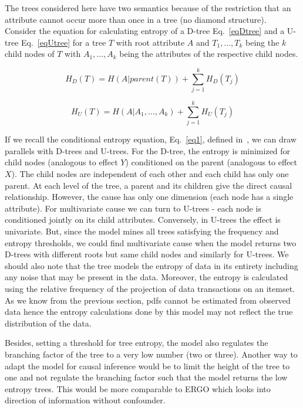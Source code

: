 \documentclass[10pt]{article}
\begin{document}
\par The trees considered here have two semantics because of the restriction that an attribute cannot occur more than once in a tree (no diamond structure). Consider the equation for calculating entropy of a D-tree Eq.~\eqref{eqDtree} and a U-tree Eq.~\eqref{eqUtree} for a tree $T$ with root attribute $A$ and $T_1, \ldots, T_k$ being the $k$ child nodes of $T$ with $A_1, \ldots, A_k$ being the attributes of the respective child nodes.

\begin{equation}\label{eqDtree}
H_D(T) = H(A|parent(T)) + \sum_{j=1}^{k}H_D(T_j)
\end{equation}

\begin{equation}\label{eqUtree}
H_U(T) = H(A|A_1, \ldots, A_k) + \sum_{j=1}^{k}H_U(T_j)
\end{equation}

\par If we recall the conditional entropy equation, Eq.~\eqref{eq1}, defined in~\cite{vreeken2015causal}, we can draw parallels with D-trees and U-trees. For the D-tree, the entropy is minimized for child nodes (analogous to effect $Y$) conditioned on the parent (analogous to effect $X$). The child nodes are independent of each other and each child has only one parent. At each level of the tree, a parent and its children give the direct causal relationship. However, the cause has only one dimension (each node has a single attribute). For multivariate cause we can turn to U-trees - each node is conditioned jointly on its child attributes. Conversely, in U-trees the effect is univariate. But, since the model mines all trees satisfying the frequency and entropy thresholds, we could find multivariate cause when the model returns two D-trees with different roots but same child nodes and similarly for U-trees. We should also note that the tree models the entropy of data in its  entirety including any noise that may be present in the data. Moreover, the entropy is calculated using the relative frequency of the projection of data transactions on an itemset. As we know from the previous section, pdfs cannot be estimated from observed data hence the entropy calculations done by this model may not reflect the true distribution of the data. 

\par Besides, setting a threshold for tree entropy, the model also regulates the branching factor of the tree to a very low number (two or three). Another way to adapt the model for causal inference would be to limit the height of the tree to one and not regulate the branching factor such that the model returns the low entropy trees. This would be more comparable to ERGO which looks into direction of information without confounder.
\end{document}
